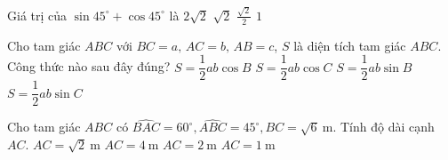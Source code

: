 \begin{ex}%
	Giá trị của $\sin 45^{\circ}+\cos 45^{\circ}$ là
	\choice
	{$2 \sqrt{2}$}
	{\True $\sqrt{2}$}
	{$\frac{\sqrt{2}}{2}$}
	{$ 1 $}
\end{ex}

\begin{ex}%
	Cho tam giác $ABC$ với $B C=a,\, A C=b,\, A B=c$, $S$ là diện tích tam giác $ABC$. Công thức nào sau đây đúng?
	\choice
	{$S=\dfrac{1}{2} a b \cos B$}
	{$S=\dfrac{1}{2} a b \cos C$}
	{$S=\dfrac{1}{2} a b \sin B$}
	{\True $S=\dfrac{1}{2} a b \sin C$}
\end{ex}
\begin{ex}%
	Cho tam giác $A B C$ có $\widehat{B A C}=60^{\circ}, \widehat{A B C}=45^{\circ}, B C=\sqrt{6}\mathrm{~m}$. Tính độ dài cạnh $A C$.
	\choice
	{$A C=\sqrt{2}\mathrm{~m}$}
	{$A C=4 \mathrm{~m}$}
	{\True $A C=2 \mathrm{~m}$}
	{$A C=1 \mathrm{~m}$}
\end{ex}

